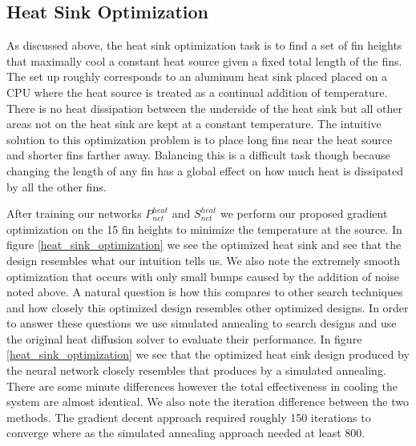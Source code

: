 \documentclass{article} %
\begin{document}
\subsection{Heat Sink Optimization}

As discussed above, the heat sink optimization task is to find a set of fin heights that maximally cool a constant heat source given a fixed total length of the fins. The set up roughly corresponds to an aluminum heat sink placed placed on a CPU where the heat source is treated as a continual addition of temperature. There is no heat dissipation between the underside of the heat sink but all other areas not on the heat sink are kept at a constant temperature. The intuitive solution to this optimization problem is to place long fins near the heat source and shorter fins farther away. Balancing this is a difficult task though because changing the length of any fin has a global effect on how much heat is dissipated by all the other fins. 

After training our networks $P^{heat}_{net}$ and $S^{heat}_{net}$ we perform our proposed gradient optimization on the 15 fin heights to minimize the temperature at the source. In figure \ref{heat_sink_optimization} we see the optimized heat sink and see that the design resembles what our intuition tells us. We also note the extremely smooth optimization that occurs with only small bumps caused by the addition of noise noted above. A natural question is how this compares to other search techniques and how closely this optimized design resembles other optimized designs. In order to answer these questions we use simulated annealing to search designs and use the original heat diffusion solver to evaluate their performance. In figure \ref{heat_sink_optimization} we see that the optimized heat sink design produced by the neural network closely resembles that produces by a simulated annealing. There are some minute differences however the total effectiveness in cooling the system are almost identical. We also note the iteration difference between the two methods. The gradient decent approach required roughly 150 iterations to converge where as the simulated annealing approach needed at least 800.
\end{document}
